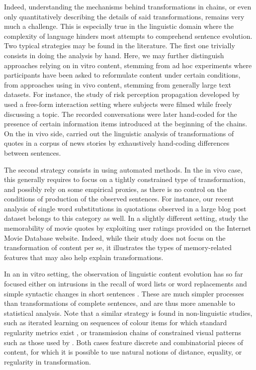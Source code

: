 Indeed, understanding the mechanisms behind transformations in chains, or even only quantitatively describing the details of said transformations, remains very much a challenge.  This is especially true in the linguistic domain where the complexity of language hinders most attempts to comprehend sentence evolution.  Two typical strategies may be found in the literature. The first one trivially consists in doing the analysis by hand.  Here, we may further distinguish approaches relying on in vitro content, stemming from ad hoc experiments where participants have been asked to reformulate content under certain conditions, from approaches using in vivo content, stemming from generally large text datasets.
For instance, the study of risk perception propagation developed by \textcite{moussaid_amplification_2015} used a free-form interaction setting where subjects were filmed while freely discussing a topic. The recorded conversations were later hand-coded for the presence of certain information items introduced at the beginning of the chains. On the in vivo side, \textcite{lauf_analyzing_2013} carried out the linguistic analysis of transformations of quotes in a corpus of news stories by exhaustively hand-coding differences between sentences.

The second strategy consists in using automated methods.  In the in vivo case, this generally requires to focus on a tightly constrained type of transformation, and possibly rely on some empirical proxies, as there is no control on the conditions of production of the observed sentences. %
For instance, our recent analysis of single word substitutions in quotations observed in a large blog post dataset \autocite{lerique-2018-semantic-drift} belongs to this category as well.
In a slightly different setting, \textcite{danescu-niculescu-mizil_you_2012} study the memorability of movie quotes by exploiting user ratings provided on the Internet Movie Database website. Indeed, while their study does not focus on the transformation of content per se, it illustrates the types of memory-related features that may also help explain transformations. 

In an in vitro setting, the observation of linguistic content evolution has so far focused either on intrusions in the recall of word lists \autocite[see][for a review]{zaromb_temporal_2006} or word replacements and simple syntactic changes in short sentences \autocites{potter_regeneration_1990}{lombardi_regeneration_1992}.
These are much simpler processes than transformations of complete sentences, and are thus more amenable to statistical analysis. Note that a similar strategy is found in non-linguistic studies, such as iterated learning on sequences of colour items for which standard regularity metrics exist \autocite{cornish_systems_2013}, or transmission chains of constrained visual patterns such as those used by \textcite{claidiere_cultural_2014}. Both cases feature discrete and combinatorial pieces of content, for which it is possible to use natural notions of distance, equality, or regularity in transformation. 



